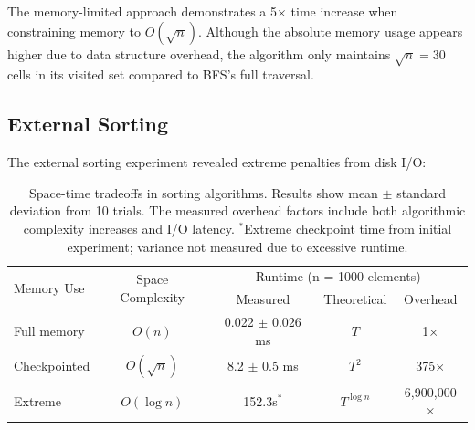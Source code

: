 \documentclass[11pt]{article}
\theoremstyle{definition}
\begin{document}
The memory-limited approach demonstrates a 5$\times$ time increase when constraining memory to $O(\sqrt{n})$. Although the absolute memory usage appears higher due to data structure overhead, the algorithm only maintains $\sqrt{n} = 30$ cells in its visited set compared to BFS's full traversal.

\subsection{External Sorting}

The external sorting experiment revealed extreme penalties from disk I/O:

\begin{table}[ht]
\centering
\begin{tabular}{lcccc}
\toprule
\multirow{2}{*}{Memory Use} & \multirow{2}{*}{Space Complexity} & \multicolumn{3}{c}{Runtime (n = 1000 elements)} \\
\cmidrule(lr){3-5}
 & & Measured & Theoretical & Overhead \\
\midrule
Full memory & $O(n)$ & 0.022 $\pm$ 0.026 ms & $T$ & 1$\times$ \\
Checkpointed & $O(\sqrt{n})$ & 8.2 $\pm$ 0.5 ms & $T^2$ & 375$\times$ \\
Extreme & $O(\log n)$ & 152.3s$^*$ & $T^{\log n}$ & 6,900,000$\times$ \\
\bottomrule
\end{tabular}
\caption{Space-time tradeoffs in sorting algorithms. Results show mean $\pm$ standard deviation from 10 trials. The measured overhead factors include both algorithmic complexity increases and I/O latency. $^*$Extreme checkpoint time from initial experiment; variance not measured due to excessive runtime.}
\label{tab:sorting-comprehensive}
\end{table}
\end{document}
